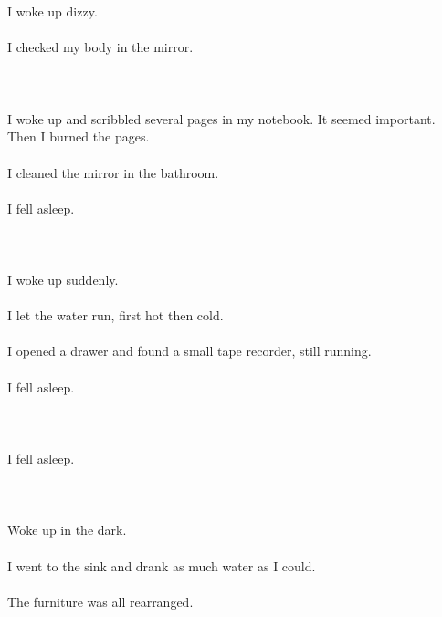 \documentclass{article}
\begin{document}
    
    \section{}
    I woke up dizzy.\\\\I checked my body in the mirror.\\\\ 
    \newpage
    
    \section{}
    I woke up and scribbled several pages in my notebook. It seemed important. Then I burned the pages.\\\\I cleaned the mirror in the bathroom.\\\\I fell asleep.\\\\ 
    \newpage
    
    \section{}
    I woke up suddenly.\\\\I let the water run, first hot then cold.\\\\I opened a drawer and found a small tape recorder, still running.\\\\I fell asleep.\\\\ 
    \newpage
    
    \section{}
    I fell asleep.\\\\ 
    \newpage
    
    \section{}
    Woke up in the dark.\\\\I went to the sink and drank as much water as I could.\\\\The furniture was all rearranged.\\\\ 
    \newpage
    
\end{document}
